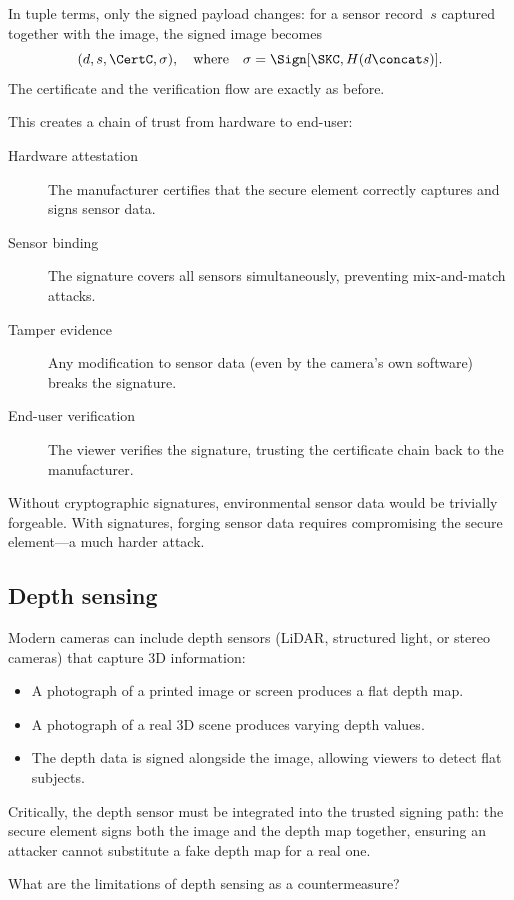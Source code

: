 In tuple terms, only the signed payload changes: for a sensor record~\(s\)
captured together with the image, the signed image becomes
\[
  (d, s, \CertC, \sigma),
  \quad\text{where}\quad
  \sigma = \Sign[\SKC, H(d \concat s)].
\]
The certificate and the verification flow are exactly as before.

This creates a chain of trust from hardware to end-user:
\begin{description}
  \item[Hardware attestation] The manufacturer certifies that the secure
    element correctly captures and signs sensor data.
  \item[Sensor binding] The signature covers all sensors simultaneously,
    preventing mix-and-match attacks.
  \item[Tamper evidence] Any modification to sensor data (even by the camera's
    own software) breaks the signature.
  \item[End-user verification] The viewer verifies the signature, trusting the
    certificate chain back to the manufacturer.
\end{description}

Without cryptographic signatures, environmental sensor data would be trivially
forgeable.
With signatures, forging sensor data requires compromising the secure
element---a much harder attack.

\subsection{Depth sensing}

Modern cameras can include depth sensors (LiDAR, structured light, or stereo
cameras) that capture 3D information:
\begin{itemize}
  \item A photograph of a printed image or screen produces a flat depth map.
  \item A photograph of a real 3D scene produces varying depth values.
  \item The depth data is signed alongside the image, allowing viewers to detect
    flat subjects.
\end{itemize}

Critically, the depth sensor must be integrated into the trusted signing path:
the secure element signs both the image and the depth map together, ensuring an
attacker cannot substitute a fake depth map for a real one.

\begin{exercise}
  What are the limitations of depth sensing as a countermeasure?
\end{exercise}

